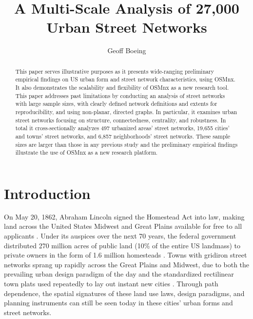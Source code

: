 \documentclass[Afour,sageh,times]{sage/sagej}
\begin{document}
\title{A Multi-Scale Analysis of 27,000 Urban Street Networks}
\author{Geoff Boeing}

\begin{abstract}
This paper serves illustrative purposes as it presents wide-ranging preliminary empirical findings on US urban form and street network characteristics, using OSMnx. It also demonstrates the scalability and flexibility of OSMnx as a new research tool. This paper addresses past limitations by conducting an analysis of street networks with large sample sizes, with clearly defined network definitions and extents for reproducibility, and using non-planar, directed graphs. In particular, it examines urban street networks focusing on structure, connectedness, centrality, and robustness. In total it cross-sectionally analyzes 497 urbanized areas' street networks, 19,655 cities' and towns' street networks, and 6,857 neighborhoods' street networks. These sample sizes are larger than those in any previous study and the preliminary empirical findings illustrate the use of OSMnx as a new research platform.
\end{abstract}


\maketitle

\section{Introduction}
On May 20, 1862, Abraham Lincoln signed the Homestead Act into law, making land across the United States Midwest and Great Plains available for free to all applicants \cite{porterfield_homestead_2005}. Under its auspices over the next 70 years, the federal government distributed 270 million acres of public land (10\% of the entire US landmass) to private owners in the form of 1.6 million homesteads \cite{lee_kansas_1979, sherraden_inclusion_2005}. Towns with gridiron street networks sprang up rapidly across the Great Plains and Midwest, due to both the prevailing urban design paradigm of the day and the standardized rectilinear town plats used repeatedly to lay out instant new cities \cite{southworth_streets_1997}. Through path dependence, the spatial signatures of these land use laws, design paradigms, and planning instruments can still be seen today in these cities' urban forms and street networks.
\end{document}
